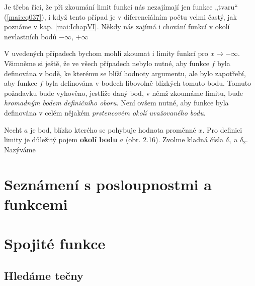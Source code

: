       

    Je třeba říci, že při zkoumání limit funkcí nás nezajímají jen funkce „tvaru“ 
    (\ref{mai:eq037}), i když tento případ je v diferenciálním počtu velmi častý, jak poznáme v 
    kap. \ref{mai:IchapVI}. Někdy nás zajímá i chování funkcí v okolí nevlastních bodů \(-\infty\), 
    \(+\infty\) 

      
    
      
    
    V uvedených případech bychom mohli zkoumat i limity funkcí pro \(x \to - \infty\).  Všimněme si 
    ještě, že ve všech případech nebylo nutné, aby funkce \(f\) byla definována v bodě, ke kterému 
    se blíží hodnoty argumentu, ale bylo zapotřebí, aby funkce \(f\) byla definována v bodech 
    libovolně blízkých tomuto bodu. Tomuto požadavku bude vyhověno, jestliže daný bod, v němž 
    zkoumáme limitu, bude \emph{hromadným bodem definičního oboru}. Není ovšem nutné, aby funkce 
    byla definována v celém nějakém \emph{prstencovém okolí uvažovaného bodu}.
    
    Nechť \(a\) je bod, blízko kterého se pohybuje hodnota proměnné \(x\). Pro definici limity je 
    důležitý pojem \textbf{okolí bodu} \(a\) (obr. 2.16). Zvolme kladná čísla \(\delta_1\) a 
    \(\delta_2\). Nazýváme
    
    
  \section{Seznámení s posloupnostmi a funkcemi}\label{mai:IchapIIIsecV}  
  \section{Spojité funkce}\label{mai:IchapIIIsecVI}
    \subsection{Hledáme tečny}\label{mai:IchapIIIsecVIIssecI}
